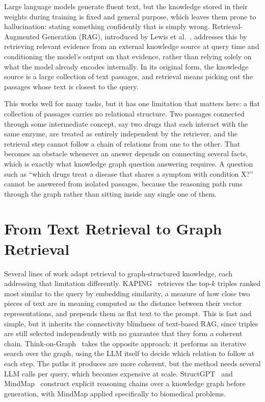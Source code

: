 Large language models generate fluent text, but the knowledge stored in their
weights during training is fixed and general purpose, which leaves them prone to
hallucination: stating something confidently that is simply wrong.
Retrieval-Augmented Generation (RAG), introduced by Lewis et
al.~\cite{lewis2020rag}, addresses this by retrieving relevant evidence from an
external knowledge source at query time and conditioning the model's output on
that evidence, rather than relying solely on what the model already encodes
internally. In its original form, the knowledge source is a large collection of
text passages, and retrieval means picking out the passages whose text is closest
to the query.

This works well for many tasks, but it has one limitation that matters here: a
flat collection of passages carries no relational structure. Two passages
connected through some intermediate concept, say two drugs that each interact
with the same enzyme, are treated as entirely independent by the retriever, and
the retrieval step cannot follow a chain of relations from one to the other. That
becomes an obstacle whenever an answer depends on connecting several facts, which
is exactly what knowledge graph question answering requires. A question such as
``which drugs treat a disease that shares a symptom with condition X?'' cannot be
answered from isolated passages, because the reasoning path runs through the
graph rather than sitting inside any single one of them.

\section{From Text Retrieval to Graph Retrieval} \label{sec:graph-retrieval}

Several lines of work adapt retrieval to graph-structured knowledge, each
addressing that limitation differently. KAPING~\cite{baek2023kaping} retrieves
the top-$k$ triples ranked most similar to the query by embedding similarity, a
measure of how close two pieces of text are in meaning computed as the distance
between their vector representations, and prepends them as flat text to the
prompt. This is fast and simple, but it inherits the connectivity blindness of
text-based RAG, since triples are still selected independently with no guarantee
that they form a coherent chain. Think-on-Graph~\cite{sun2024thinkongraph} takes
the opposite approach: it performs an iterative search over the graph, using the
LLM itself to decide which relation to follow at each step. The paths it produces
are more coherent, but the method needs several LLM calls per query, which becomes
expensive at scale. StructGPT~\cite{jiang2023structgpt} and
MindMap~\cite{wen2023mindmap} construct explicit reasoning chains over a
knowledge graph before generation, with MindMap applied specifically to
biomedical problems.

